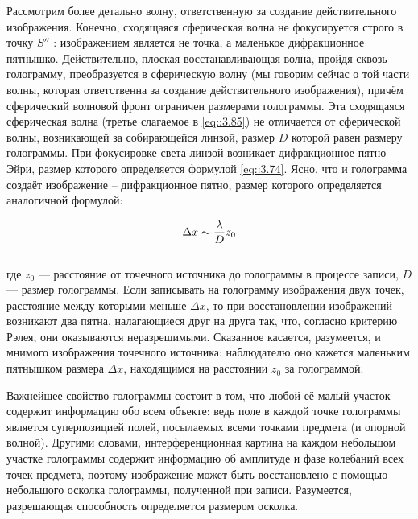 
Рассмотрим более детально волну, ответственную за создание действительного изображения. Конечно, 
сходящаяся сферическая волна не фокусируется строго в точку $S''$ : изображением является не точка, 
а маленькое дифракционное пятнышко. Действительно, плоская восстанавливающая волна, пройдя сквозь 
голограмму, преобразуется в сферическую волну (мы говорим сейчас о той части волны, которая
ответственна за создание действительного изображения), причём сферический волновой фронт ограничен 
размерами голограммы. Эта сходящаяся сферическая волна (третье слагаемое в \eqref{eq::3.85})
не отличается от сферической волны, возникающей за собирающейся линзой, размер $D$ которой равен 
размеру голограммы. При фокусировке света линзой возникает дифракционное пятно Эйри, размер которого 
определяется формулой \eqref{eq::3.74}. Ясно, что и голограмма создаёт изображение -- дифракционное 
пятно, размер которого определяется аналогичной формулой:

\begin{equation}
    \Delta x \thicksim \frac{\lambda}{D} z_0
\end{equation}
\\
где $z_0$ — расстояние от точечного источника до голограммы в процессе записи, $D$ — размер голограммы.
Если записывать на голограмму изображения двух точек, расстояние между которыми меньше $\Delta x$,
то при восстановлении изображений возникают два пятна, налагающиеся друг на друга так, что, согласно
критерию Рэлея, они оказываются неразрешимыми. Сказанное касается, разумеется, и мнимого изображения
точечного источника: наблюдателю оно кажется маленьким пятнышком размера $\Delta x$, находящимся
на расстоянии $z_0$ за голограммой.

Важнейшее свойство голограммы состоит в том, что любой её малый участок содержит информацию обо всем 
объекте: ведь поле в каждой точке голограммы является суперпозицией полей, посылаемых всеми
точками предмета (и опорной волной). Другими словами, интерференционная картина на каждом небольшом 
участке голограммы содержит информацию об амплитуде и фазе колебаний всех точек предмета, поэтому 
изображение может быть восстановлено с помощью небольшого осколка голограммы, полученной при записи.
Разумеется, разрешающая способность определяется размером осколка.